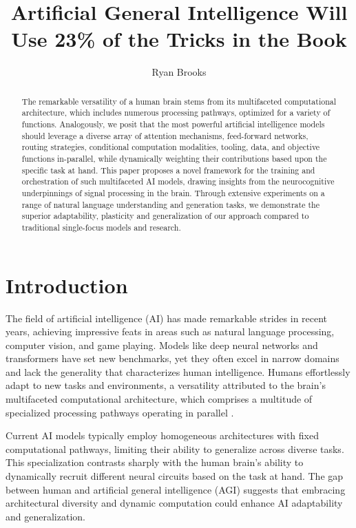\documentclass{article}
\begin{document}
\title{Artificial General Intelligence Will Use 23\% of the Tricks in the Book}
\author{Ryan Brooks}
\date{}

\maketitle

\begin{abstract}
    The remarkable versatility of a human brain stems from its multifaceted computational architecture, which includes numerous processing pathways, optimized for a variety of functions. Analogously, we posit that the most powerful artificial intelligence models should leverage a diverse array of attention mechanisms, feed-forward networks, routing strategies, conditional computation modalities, tooling, data, and objective functions in-parallel, while dynamically weighting their contributions based upon the specific task at hand. This paper proposes a novel framework for the training and orchestration of such multifaceted AI models, drawing insights from the neurocognitive underpinnings of signal processing in the brain. Through extensive experiments on a range of natural language understanding and generation tasks, we demonstrate the superior adaptability, plasticity and generalization of our approach compared to traditional single-focus models and research.
\end{abstract}

\section{Introduction}

The field of artificial intelligence (AI) has made remarkable strides in recent years, achieving impressive feats in areas such as natural language processing, computer vision, and game playing. Models like deep neural networks and transformers have set new benchmarks, yet they often excel in narrow domains and lack the generality that characterizes human intelligence. Humans effortlessly adapt to new tasks and environments, a versatility attributed to the brain's multifaceted computational architecture, which comprises a multitude of specialized processing pathways operating in parallel \cite{vaswani2017attention}.

Current AI models typically employ homogeneous architectures with fixed computational pathways, limiting their ability to generalize across diverse tasks. This specialization contrasts sharply with the human brain's ability to dynamically recruit different neural circuits based on the task at hand. The gap between human and artificial general intelligence (AGI) suggests that embracing architectural diversity and dynamic computation could enhance AI adaptability and generalization.
\end{document}
